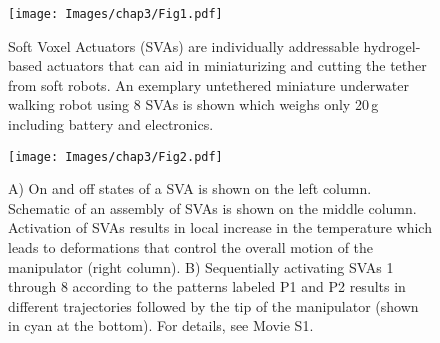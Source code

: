 \begin{figure}[t]
\centering
\texttt{[image: Images/chap3/Fig1.pdf]}
    \caption{Soft Voxel Actuators (SVAs) are individually addressable hydrogel-based actuators that can aid in miniaturizing and cutting the tether from soft robots. 
    An exemplary untethered miniature underwater walking robot using 8 SVAs is shown which weighs only 20\,g including battery and electronics.}
    \label{fig:concept}
\end{figure}
\begin{figure*}[th]
      \centering
      \texttt{[image: Images/chap3/Fig2.pdf]}
      \caption{A) On and off states of a SVA is shown on the left column. Schematic of an assembly of SVAs is shown on the middle column. Activation of SVAs results in local increase in the temperature which leads to deformations that control the overall motion of the manipulator (right column). B) Sequentially activating SVAs 1 through 8 according to the patterns labeled P1 and P2 results in different trajectories followed by the tip of the manipulator (shown in cyan at the bottom). For details, see Movie S1.}
      \label{fig:treajectory}
   \end{figure*}